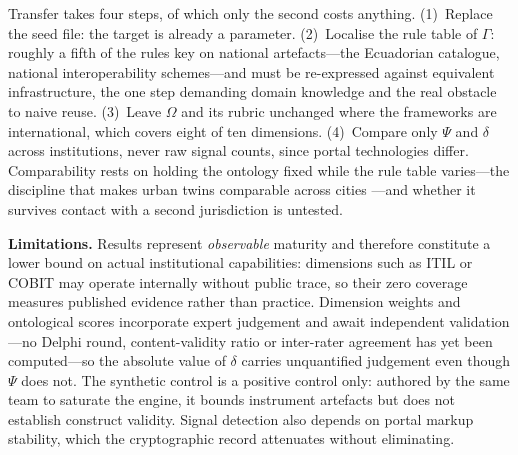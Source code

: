\documentclass[engproc,proceedingpaper,submit,moreauthors]{Definitions/mdpi}
\begin{document}
    Transfer takes four steps, of which only the second costs anything. (1)~Replace the seed file: the target is already a parameter. (2)~Localise the rule table of $\Gamma$: roughly a fifth of the rules key on national artefacts---the Ecuadorian catalogue, national interoperability schemes---and must be re-expressed against equivalent infrastructure, the one step demanding domain knowledge and the real obstacle to naive reuse. (3)~Leave $\Omega$ and its rubric unchanged where the frameworks are international, which covers eight of ten dimensions. (4)~Compare only $\Psi$ and $\delta$ across institutions, never raw signal counts, since portal technologies differ. Comparability rests on holding the ontology fixed while the rule table varies---the discipline that makes urban twins comparable across cities \cite{Shahat2021,Haraguchi2024}---and whether it survives contact with a second jurisdiction is untested.

\textbf{Limitations.}
    Results represent \emph{observable} maturity and therefore constitute a lower bound on actual institutional capabilities: dimensions such as ITIL or COBIT may operate internally without public trace, so their zero coverage measures published evidence rather than practice. Dimension weights and ontological scores incorporate expert judgement and await independent validation---no Delphi round, content-validity ratio \cite{Lawshe1975} or inter-rater agreement has yet been computed---so the absolute value of $\delta$ carries unquantified judgement even though $\Psi$ does not. The synthetic control is a positive control only: authored by the same team to saturate the engine, it bounds instrument artefacts but does not establish construct validity. Signal detection also depends on portal markup stability, which the cryptographic record attenuates without eliminating.
\end{document}

